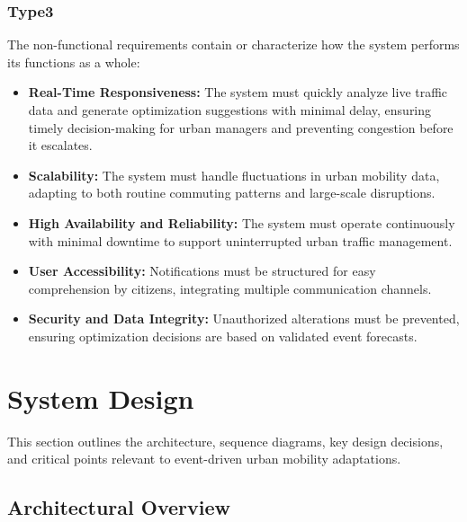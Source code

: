 \documentclass[a4paper,12pt]{article}
\begin{document}
\subsubsection*{Type3}
The non-functional requirements contain or characterize how the system performs its functions as a whole:
\begin{itemize}
    \item \textbf{Real-Time Responsiveness:}  
    The system must quickly analyze live traffic data and generate optimization suggestions with minimal delay, ensuring timely decision-making for urban managers and preventing congestion before it escalates.

    \item \textbf{Scalability:}  
    The system must handle fluctuations in urban mobility data, adapting to both routine commuting patterns and large-scale disruptions.

    \item \textbf{High Availability and Reliability:}  
    The system must operate continuously with minimal downtime to support uninterrupted urban traffic management.

    \item \textbf{User Accessibility:}  
    Notifications must be structured for easy comprehension by citizens, integrating multiple communication channels.

    \item \textbf{Security and Data Integrity:}  
    Unauthorized alterations must be prevented, ensuring optimization decisions are based on validated event forecasts.
\end{itemize}

\newpage

\section{System Design}
This section outlines the architecture, sequence diagrams, key design decisions, and critical points relevant to event-driven urban mobility adaptations.

\subsection{Architectural Overview}
\end{document}
